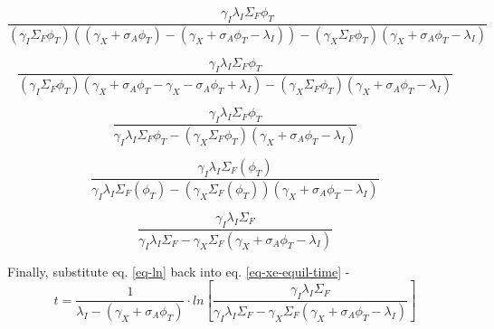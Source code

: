 \documentclass[11pt,a4paper]{article}
\begin{document}
\begin{equation}
    \frac{
        \gamma_I\lambda_I\Sigma_F\phi_T
    }
    {
        (\gamma_I\Sigma_F\phi_T)((\gamma_X+\sigma_A\phi_T) - (\gamma_X+\sigma_A\phi_T-\lambda_I))
        - (\gamma_X\Sigma_F\phi_T)(\gamma_X+\sigma_A\phi_T-\lambda_I)
    }
\end{equation}
\vspace{\baselineskip}

\begin{equation}
    \frac{
        \gamma_I\lambda_I\Sigma_F\phi_T
    }
    {
        (\gamma_I\Sigma_F\phi_T)(\gamma_X + \sigma_A\phi_T - \gamma_X - \sigma_A\phi_T + \lambda_I)
        - (\gamma_X\Sigma_F\phi_T)(\gamma_X+\sigma_A\phi_T-\lambda_I)
    }
\end{equation}
\vspace{\baselineskip}

\begin{equation}
    \frac{
        \gamma_I\lambda_I\Sigma_F\phi_T
    }
    {
        \gamma_I\lambda_I\Sigma_F\phi_T
        - (\gamma_X\Sigma_F\phi_T)(\gamma_X+\sigma_A\phi_T-\lambda_I)
    }
\end{equation}
\vspace{\baselineskip}

\begin{equation}
    \frac{
        \gamma_I\lambda_I\Sigma_F(\phi_T)
    }
    {
        \gamma_I\lambda_I\Sigma_F(\phi_T)
        - (\gamma_X\Sigma_F(\phi_T))(\gamma_X+\sigma_A\phi_T-\lambda_I)
    }
\end{equation}
\vspace{\baselineskip}

\begin{equation} \label{eq-ln}
    \frac{
        \gamma_I\lambda_I\Sigma_F
    }
    {
        \gamma_I\lambda_I\Sigma_F
        - \gamma_X\Sigma_F(\gamma_X+\sigma_A\phi_T-\lambda_I)
    }
\end{equation}
\vspace{\baselineskip}
\vspace{\baselineskip}

\noindent Finally, substitute eq. \ref{eq-ln} back into eq. \ref{eq-xe-equil-time} -  
\begin{equation} \label{eq-xe-equil-time}
    t=\frac{1}{\lambda_I-(\gamma_X+\sigma_A\phi_T)} \cdot  
    ln[    \frac{
        \gamma_I\lambda_I\Sigma_F
    }
    {
        \gamma_I\lambda_I\Sigma_F
        - \gamma_X\Sigma_F(\gamma_X+\sigma_A\phi_T-\lambda_I)
    }]
\end{equation}
\end{document}
